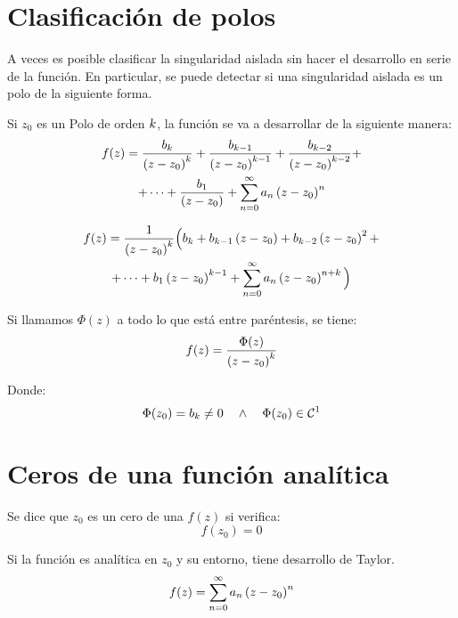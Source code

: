 \documentclass[a5paper,12pt,twoside]{book}
\begin{document}
\section{Clasificación de polos}

A veces es posible clasificar la singularidad aislada sin hacer el desarrollo en serie de la función. En particular, se puede detectar si una singularidad aislada es un polo de la siguiente forma.

Si $z_0$ es un Polo de orden $k$, la función se va a desarrollar de la siguiente manera:
\begin{multline*}
    f(z) = \frac{b_k}{\left(z-z_0\right)^k} + \frac{b_{k-1}}{\left(z-z_0\right)^{k-1}} + \frac{b_{k-2}}{\left(z-z_0\right)^{k-2}} +
    \\
    + \dots + \frac{b_1}{\left(z-z_0\right)} + \sum_{n=0}^\infty a_n \left(z-z_0\right)^n
\end{multline*}

\begin{multline*}
    f(z) = \frac{1}{\left(z-z_0\right)^k} \Big( b_k + b_{k-1} \left(z-z_0\right) + b_{k-2} \left(z-z_0\right)^2 +
    \\
    + \dots + b_1 \left(z-z_0\right)^{k-1} + \sum_{n=0}^\infty a_n \left(z-z_0\right)^{n+k} \Big)
\end{multline*}

Si llamamos $\Phi(z)$ a todo lo que está entre paréntesis, se tiene:
\begin{equation*}
    f(z) = \frac{\Phi(z)}{\left(z-z_0\right)^k}
\end{equation*}

Donde:
\begin{equation*}
    \Phi (z_0) = b_k \neq 0 \quad \land \quad \Phi (z_0) \in \mathcal{C}^{1}
\end{equation*}


\section{Ceros de una función analítica}

Se dice que $z_0$ es un cero de una $f(z)$ si verifica:
\begin{equation*}
    f(z_0)=0
\end{equation*}

Si la función es analítica en $z_0$ y su entorno, tiene desarrollo de Taylor.
\begin{equation*}
    f(z) = \sum_{n=0}^\infty a_n \left(z-z_0\right)^n
\end{equation*}
\end{document}
